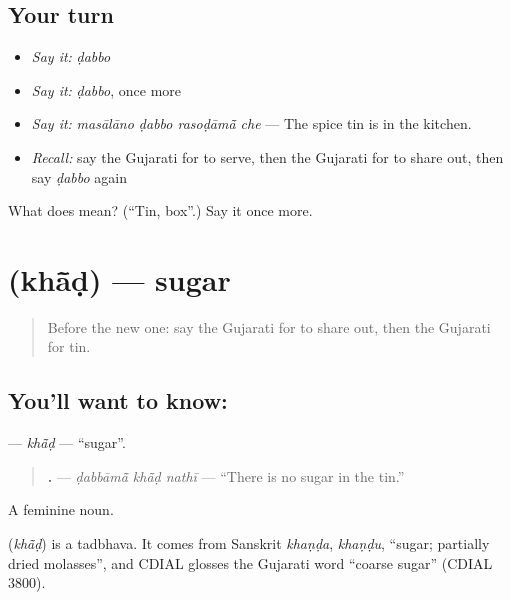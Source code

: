 \subsection*{Your turn}
\begin{itemize}
\raggedright
  \item \emph{Say it:} \emph{ḍabbo}
  \item \emph{Say it:} \emph{ḍabbo}, once more
  \item \emph{Say it:} \emph{masālāno ḍabbo rasoḍāmā̃ che} — The spice tin is in the kitchen.
  \item \emph{Recall:} say the Gujarati for to serve, then the Gujarati for to share out, then say \emph{ḍabbo} again
\end{itemize}

\begin{tcolorbox}[breakable,colback=teal!4,colframe=teal!35!black,title={Before you move on}]
What does  mean? (\textquotedblleft{}Tin, box\textquotedblright{}.) Say it once more.
\end{tcolorbox}
\section[\texorpdfstring{\gu{ખાંડ} (khā̃ḍ)}{ખાંડ (khā̃ḍ)}]{ (khā̃ḍ) — sugar}

\label{lesson:GU-C164-khad}



\begin{quote}
Before the new one: say the Gujarati for to share out, then the Gujarati for tin.
\end{quote}

\subsection*{You'll want to know: }
\textbf{} — \emph{khā̃ḍ} — \textquotedblleft{}sugar\textquotedblright{}.

\begin{quote}
\textbf{  .} — \emph{ḍabbāmā̃ khā̃ḍ nathī} — \textquotedblleft{}There is no sugar in the tin.\textquotedblright{}
\end{quote}

A feminine noun.

\begin{cousinweb}
\textbf{} (\emph{khā̃ḍ}) is a tadbhava. It comes from Sanskrit \emph{khaṇḍa}, \emph{khaṇḍu}, \textquotedblleft{}sugar; partially dried molasses\textquotedblright{}, and CDIAL glosses the Gujarati word \textquotedblleft{}coarse sugar\textquotedblright{} (CDIAL 3800).
\end{cousinweb}


